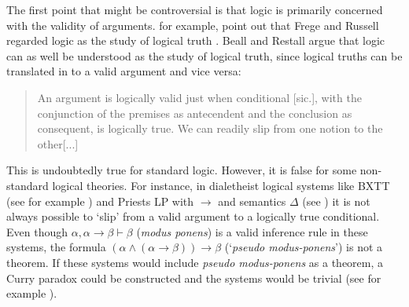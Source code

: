 \documentclass{article}
\begin{document}
The first point that might be controversial is that logic is primarily concerned with the validity of arguments.  for example, point out that Frege and Russell regarded logic as the study of logical truth \cite[p.~13]{beallrestall}. Beall and Restall argue that logic can as well be understood as the study of logical truth, since logical truths can be translated in to a valid argument and vice versa:
\begin{quote}
    An argument is logically valid just when conditional [sic.], with the conjunction of the premises as antecendent and the conclusion as consequent, is logically true. We can readily slip from one notion to the other[...] \cite[p.~13]{beallrestall}
\end{quote}
This is undoubtedly true for standard logic. However, it is false for some non-standard logical theories. For instance, in dialetheist logical systems like BXTT (see for example ) and Priests LP with $\rightarrow$ and semantics $\Delta$ (see ) it is not always possible to `slip' from a valid argument to a logically true conditional. Even though $\alpha,\alpha\rightarrow\beta\vdash \beta$ (\textit{modus ponens}) is a valid inference rule in these systems, the formula \mbox{$(\alpha\wedge(\alpha\rightarrow\beta))\rightarrow\beta$} (`\textit{pseudo modus-ponens}') is not a theorem. If these systems would include \textit{pseudo modus-ponens} as a theorem, a Curry paradox could be constructed and the systems would be trivial (see for example ).
\end{document}
